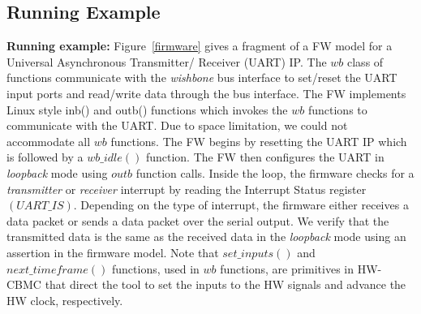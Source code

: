 \documentclass[sigconf]{acmart}
\newcommand{\sjcmt}[1]{{\color{blue} [{#1}]}}
\newcommand{\Omit}[1]{}
\begin{document}
\subsection{Running Example}
{\bf Running example: }
Figure~\ref{firmware} gives a fragment of a FW model for a Universal 
Asynchronous Transmitter/ Receiver (UART) IP.  The
$wb$ class of functions communicate with the {\em wishbone} bus interface to
set/reset the UART input ports and read/write data through the bus
interface.  The FW implements Linux style inb() and outb() functions which
invokes the $wb$ functions to communicate with the UART.  Due to space
limitation, we could not accommodate all $wb$ functions.  The FW begins by
resetting the UART IP which is followed by a $wb\_idle()$ function.  The 
FW then configures the UART in {\em loopback} mode using $outb$ function calls. 
Inside the loop, the firmware checks for a {\em transmitter} or {\em
receiver} interrupt by reading the Interrupt Status register $(UART\_IS)$. 
Depending on the type of interrupt, the firmware either receives a data packet 
or sends a data packet over the serial output. We verify that the transmitted 
data is the same as the received data in the {\em loopback} mode using an 
assertion in the firmware model. Note that $set\_inputs()$ and
$next\_timeframe()$ functions, used in $wb$ functions, are 
primitives in \textsc{HW-CBMC} that direct the tool to set the 
inputs to the HW signals and advance the HW clock, respectively. 

\Omit{
The $set\_inputs()$ and the $next\_timeframe()$ functions are primitives
in \textsc{HW-CBMC} that direct the tool to set the inputs to the HW
signals and advance the HW clock, respectively.  Recall that $\mathcal{SN}$
is the synthesized word-level representation of HW RTL. In the unified
FW-HW model, $\mathcal{PN}$, these primitives are implemented by invoking
the top level module of $\mathcal{SN}$ which is the top module of the UART
RTL IP core.
}

\Omit{ 
In Figure~\ref{firmware}, the firmware executes scenario, $\mathcal{S}$, 
to configure the UART IP in {\em loopback} mode. A property $\psi$ can be as follows: \\
{\em If the content of memory mapped registers (mode configuration and interrupt 
enable) is, $UART\_MC = 0x13$ and $UART\_IE = 0x03$,  then the serial output of 
the transmitter, $UART\_TX$, should not be in high-impedance $(Z)$ state and 
the transmitter buffer must not be EMPTY.}  \\
Note that the antecedent of the property (configuring the UART in 
loopback with interrupt enabled) defines a scenario and the 
consequent defines the condition on the HW transaction. 
In this example, $\mathcal{T}$ \sjcmt{Where did
$\mathcal{T}$ come from?} is a finite-duration service 
through the UART state machine, $(UART\_TX and UART\_RX)$, that 
is spread over multiple clock cycles. 
}
\end{document}

